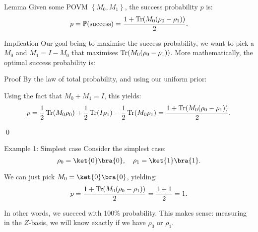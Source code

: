 \documentclass[a4paper]{article}
\begin{document}
\begin{parag}{Lemma}
    Given some POVM $\left\{M_0, M_1\right\}$, the success probability $p$ is:
    \[p = \prob\left(\text{success}\right) = \frac{1 + \Tr\left(M_0 \left(\rho_0 - \rho_1\right)\right)}{2}.\]

    \begin{subparag}{Implication}
        Our goal being to maximise the success probability, we want to pick a $M_0$ and $M_1 = I - M_0$ that maximises $\Tr\left(M_0 \left(\rho_0 - \rho_1\right)\right)$. More mathematically, the optimal success probability is:
    \end{subparag}

    \begin{subparag}{Proof}
        By the law of total probability, and using our uniform prior:

        Using the fact that $M_0 + M_1 = I$, this yields: 
        \[p = \frac{1}{2} \Tr\left(M_0 \rho_0\right) + \frac{1}{2} \Tr\left(I \rho_1\right) - \frac{1}{2} \Tr\left(M_0 \rho_1\right) = \frac{1 + \Tr\left(M_0 \left(\rho_0 - \rho_1\right)\right)}{2}.\]
        
        \qed
    \end{subparag}
\end{parag}

\begin{parag}{Example 1: Simplest case}
    Consider the simplest case: 
    \[\rho_0 = \ket{0}\bra{0}, \mathspace \rho_1 = \ket{1}\bra{1}.\]
    
    We can just pick $M_0 = \ket{0}\bra{0}$, yielding: 
    \[p = \frac{1 + \Tr\left(M_0 \left(\rho_0 - \rho_1\right)\right)}{2} = \frac{1 + 1}{2} = 1.\]
    
    In other words, we succeed with 100\% probability. This makes sense: measuring in the $Z$-basis, we will know exactly if we have $\rho_0$ or $\rho_1$. 
\end{parag}
\end{document}
